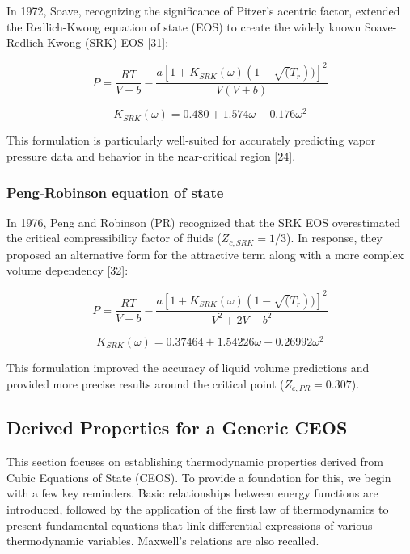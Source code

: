 	In 1972, Soave, recognizing the significance of Pitzer's acentric factor,
	extended the Redlich-Kwong equation of state (EOS) to create the widely
	known Soave-Redlich-Kwong (SRK) EOS [31]:

	\begin{equation}
		P = \frac{RT}{V-b}-\frac{a[1+K_{SRK}(\omega)(1-\sqrt(T_r))]^2}{V(V+b)}
	\end{equation}

	\begin{equation}
		K_{SRK}(\omega) = 0.480 + 1.574\omega -0.176\omega^2
	\end{equation}

	This formulation is particularly well-suited for accurately predicting vapor
	pressure data and behavior in the near-critical region [24].

	\subsubsection{Peng-Robinson equation of state}

	In 1976, Peng and Robinson (PR) recognized that the SRK EOS overestimated
	the critical compressibility factor of fluids ($Z_{c,SRK} = 1/3$). In response,
	they proposed an alternative form for the attractive term along with a more
	complex volume dependency [32]:

	\begin{equation}
		P = \frac{RT}{V-b}-\frac{a[1+K_{SRK}(\omega)(1-\sqrt(T_r))]^2}{V^2 +2V -b^2}
	\end{equation}

	\begin{equation}
		K_{SRK}(\omega) = 0.37464 + 1.54226\omega -0.26992\omega^2
	\end{equation}

	This formulation improved the accuracy of liquid volume predictions and
	provided more precise results around the critical point ($Z_{c,PR} = 0.307$).

	\subsection{Derived Properties for a Generic CEOS}
	This section focuses on establishing thermodynamic properties derived from
	Cubic Equations of State (CEOS). To provide a foundation for this, we begin
	with a few key reminders. Basic relationships between energy functions are
	introduced, followed by the application of the first law of thermodynamics
	to present fundamental equations that link differential expressions of
	various thermodynamic variables. Maxwell's relations are also recalled.

